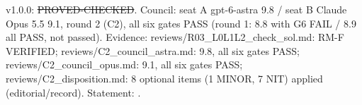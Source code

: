 \begin{theorem}\label{reg:W3-RM_RM-F}
\end{theorem}
\begin{statusbox}
 v1.0.0: \st{PROVED-CHECKED}. Council: seat A gpt-6-astra 9.8 / seat B Claude Opus 5.5 9.1, round 2 (C2), all six gates PASS (round 1: 8.8 with G6 FAIL / 8.9 all PASS, not passed). Evidence: reviews/R03\_L0L1L2\_check\_sol.md: RM-F VERIFIED; reviews/C2\_council\_astra.md: 9.8, all six gates PASS; reviews/C2\_council\_opus.md: 9.1, all six gates PASS; reviews/C2\_disposition.md: 8 optional items (1 MINOR, 7 NIT) applied (editorial/record). Statement: .
\end{statusbox}

